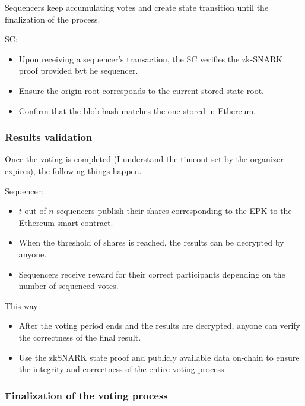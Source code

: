 Sequencers keep accumulating votes and create state transition until the finalization of the process.


SC:

\begin{itemize}
	\item Upon receiving a sequencer's transaction, the SC verifies the zk-SNARK proof provided byt he sequencer.
	\item Ensure the origin root corresponds to the current stored state root.
	\item Confirm that the blob hash matches the one stored in Ethereum.
\end{itemize}

\subsubsection{Results validation}
\label{sec:vocdoni-protocol:validation}

Once the voting is completed (I understand the timeout set by the organizer expires), the following things happen.

Sequencer:

\begin{itemize}
	\item $t$ out of $n$ sequencers publish their shares corresponding to the EPK to the Ethereum smart contract.
	\item When the threshold of shares is reached, the results can be decrypted by anyone.
	\item Sequencers receive reward for their correct participants depending on the number of sequenced votes.
\end{itemize}

This way:

\begin{itemize}
	\item After the voting period ends and the results are decrypted, anyone can verify the correctness of the final result.
	\item Use the zkSNARK state proof and publicly available data on-chain to ensure the integrity and correctness of the entire voting process.
\end{itemize}

\subsubsection{Finalization of the voting process}
\label{sec:vocdoni-protocol:finalization}

